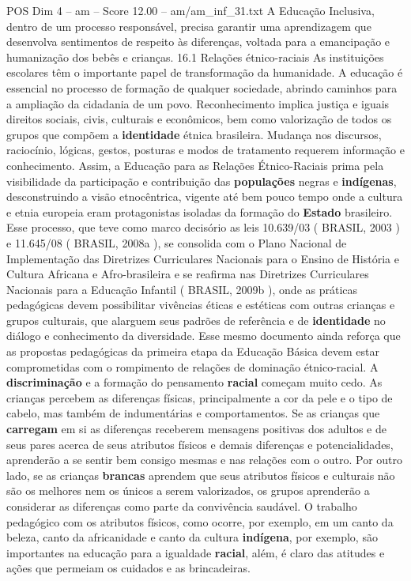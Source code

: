 \begin{textsample}{POS Dim 4 – am – Score 12.00 – am/am\_inf\_31.txt}
A Educação Inclusiva, dentro de um processo responsável, precisa garantir uma aprendizagem que desenvolva sentimentos de respeito às diferenças, voltada para a emancipação e humanização dos bebês e crianças. 16.1 Relações étnico-raciais As instituições escolares têm o importante papel de transformação da humanidade.
A educação é essencial no processo de formação de qualquer sociedade, abrindo caminhos para a ampliação da cidadania de um povo.
Reconhecimento implica justiça e iguais direitos sociais, civis, culturais e econômicos, bem como valorização de todos os grupos que compõem a \textbf{identidade} étnica brasileira.
Mudança nos discursos, raciocínio, lógicas, gestos, posturas e modos de tratamento requerem informação e conhecimento.
Assim, a Educação para as Relações Étnico-Raciais prima pela visibilidade da participação e contribuição das \textbf{populações} negras e \textbf{indígenas}, desconstruindo a visão etnocêntrica, vigente até bem pouco tempo onde a cultura e etnia europeia eram protagonistas isoladas da formação do \textbf{Estado} brasileiro.
Esse processo, que teve como marco decisório as leis 10.639/03 ( BRASIL, 2003 ) e 11.645/08 ( BRASIL, 2008a ), se consolida com o Plano Nacional de Implementação das Diretrizes Curriculares Nacionais para o Ensino de História e Cultura Africana e Afro-brasileira e se reafirma nas Diretrizes Curriculares Nacionais para a Educação Infantil ( BRASIL, 2009b ), onde as práticas pedagógicas devem possibilitar vivências éticas e estéticas com outras crianças e grupos culturais, que alarguem seus padrões de referência e de \textbf{identidade} no diálogo e conhecimento da diversidade.
Esse mesmo documento ainda reforça que as propostas pedagógicas da primeira etapa da Educação Básica devem estar comprometidas com o rompimento de relações de dominação étnico-racial.
A \textbf{discriminação} e a formação do pensamento \textbf{racial} começam muito cedo.
As crianças percebem as diferenças físicas, principalmente a cor da pele e o tipo de cabelo, mas também de indumentárias e comportamentos.
Se as crianças que \textbf{carregam} em si as diferenças receberem mensagens positivas dos adultos e de seus pares acerca de seus atributos físicos e demais diferenças e potencialidades, aprenderão a se sentir bem consigo mesmas e nas relações com o outro.
Por outro lado, se as crianças \textbf{brancas} aprendem que seus atributos físicos e culturais não são os melhores nem os únicos a serem valorizados, os grupos aprenderão a considerar as diferenças como parte da convivência saudável.
O trabalho pedagógico com os atributos físicos, como ocorre, por exemplo, em um canto da beleza, canto da africanidade e canto da cultura \textbf{indígena}, por exemplo, são importantes na educação para a igualdade \textbf{racial}, além, é claro das atitudes e ações que permeiam os cuidados e as brincadeiras.

\end{textsample}
